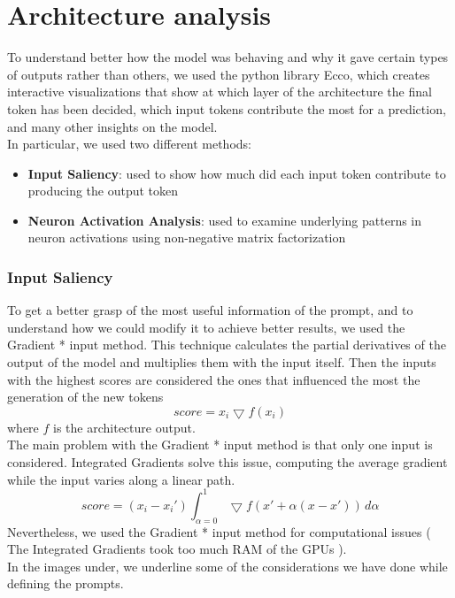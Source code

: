 \section{Architecture analysis}
To understand better how the model was behaving and why it gave certain types of outputs rather than others, we used the python library Ecco\cite{alammar-2021-ecco}, which creates interactive visualizations that show at which layer of the architecture the final token has been decided, which input tokens contribute the most for a prediction, and many other insights on the model. \\
In particular, we used two different methods:
\begin{itemize}
    \item \textbf{Input Saliency}: used to show how much did each input token contribute to producing the output token
    \item \textbf{Neuron Activation Analysis}: used to examine underlying patterns in neuron activations using non-negative matrix factorization
\end{itemize}
\subsubsection*{Input Saliency}
To get a better grasp of the most useful information of the prompt, and to understand how we could modify it to achieve better results, we used the Gradient * input\cite{shrikumar2017learning} method. This technique calculates the partial derivatives of the output of the model and multiplies them with the input itself. Then the inputs with the highest scores are considered the ones that influenced the most the generation of the new tokens
\begin{equation*}
    score = x_i \bigtriangledown f(x_i)
\end{equation*}
where $f$ is the architecture output. \\
The main problem with the Gradient * input method is that only one input is considered. Integrated Gradients\cite{sundararajan2017axiomatic} solve this issue, computing the average gradient while the input varies along a linear path.
\begin{equation*}
    score = (x_i - x_i')\int_{\alpha = 0}^{1} \bigtriangledown f(x' + \alpha(x - x')) \,d\alpha 
\end{equation*}
Nevertheless, we used the Gradient * input method for computational issues ( The Integrated Gradients took too much RAM of the GPUs ).\\
In the images under, we underline some of the considerations we have done while defining the prompts.

